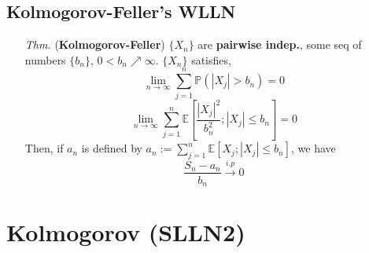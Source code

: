 \documentclass[a4paper,12pt,twoside]{book}
\begin{document}
\subsection{Kolmogorov-Feller's WLLN}
\begin{itemize}
	\item[\textit{Thm.}] (\textbf{Kolmogorov-Feller}) $\{X_n\}$ are \textbf{pairwise indep.}, some seq of numbers $\{b_n\}$, $0<b_n\nearrow \infty$. $\{X_n\}$ satisfies, 
	\begin{equation}
		\lim\limits_{n\rightarrow\infty}\sum_{j=1}^n \mathbb{P}\left(|X_j|>b_n\right)=0
	\end{equation}
	\begin{equation}
		\lim\limits_{n\rightarrow\infty}\sum_{j=1}^n \mathbb{E}\left[\frac{|X_j|^2}{b_n^2};|X_j|\leq b_n\right]=0
	\end{equation}
	Then, if $a_n$ is defined by $a_n:=\sum_{j=1}^n \mathbb{E}\left[X_j;|X_j|\leq b_n\right]$, we have
	\begin{equation}
		\frac{S_n - a_n}{b_n} \xrightarrow{i.p} 0
	\end{equation}
\end{itemize}


\section{Kolmogorov (SLLN2)}

\end{document}
